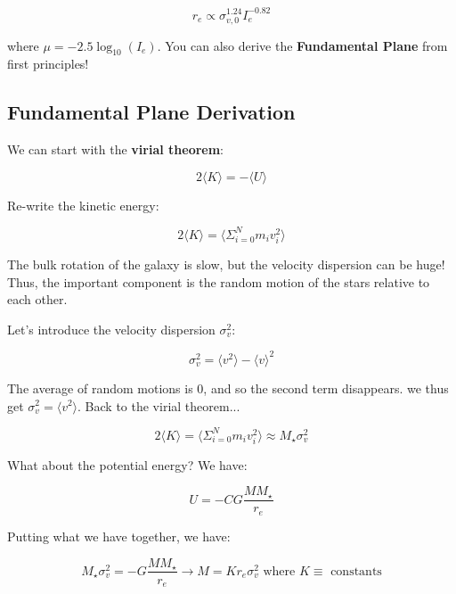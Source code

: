 \documentclass{article}
\begin{document}
\begin{equation}
    r_e \propto \sigma_{v,0}^{1.24} I_e^{-0.82}
\end{equation}

where $\mu = -2.5\log_{10}\left(I_e\right)$. You can also derive the \textbf{Fundamental Plane} from first principles!

\subsection{Fundamental Plane Derivation}

We can start with the \textbf{virial theorem}:

\begin{equation}
    2 \langle K\rangle = -\langle U \rangle
\end{equation}

Re-write the kinetic energy:

\begin{equation}
    2 \langle K \rangle = \langle \Sigma_{i=0}^{N} m_i v_i ^2 \rangle
\end{equation}

The bulk rotation of the galaxy is slow, but the velocity dispersion can be huge! Thus, the important component is the random motion of the stars relative to each other. 

Let's introduce the velocity dispersion $\sigma_v^2$:

\begin{equation}
    \sigma_v^2 = \langle v^2 \rangle - \langle v \rangle^2
\end{equation}

The average of random motions is $0$, and so the second term disappears. we thus get $\sigma_v^2 = \langle v^2 \rangle$. Back to the virial theorem...

\begin{equation}
    2 \langle K \rangle = \langle \Sigma _{i=0}^{N} m_i v_i ^2 \rangle \approx M_\star \sigma_v^2
\end{equation}

What about the potential energy? We have:

\begin{equation}
    U = - C G \frac{M M_\star}{r_e}
\end{equation}

Putting what we have together, we have:

\begin{equation}
    M_\star \sigma_v^2 = - G \frac{M M_\star}{r_e} \rightarrow M = K r_e \sigma_v^2 \text{ where } K \equiv \text{ constants}
\end{equation}
\end{document}
